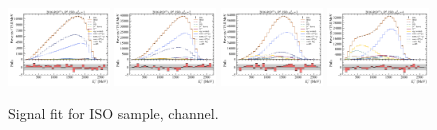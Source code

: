 \begin{figure}[!htb]
    \includegraphics[width=0.24\textwidth]{./figs-fit-fit-results/sig-fit/lines_q2_slices/fit_result-lines_q2_idx1-D0-iso-el.pdf}
    \includegraphics[width=0.24\textwidth]{./figs-fit-fit-results/sig-fit/lines_q2_slices/fit_result-lines_q2_idx2-D0-iso-el.pdf}
    \includegraphics[width=0.24\textwidth]{./figs-fit-fit-results/sig-fit/lines_q2_slices/fit_result-lines_q2_idx3-D0-iso-el.pdf}
    \includegraphics[width=0.24\textwidth]{./figs-fit-fit-results/sig-fit/lines_q2_slices/fit_result-lines_q2_idx4-D0-iso-el.pdf}

    \caption{Signal fit for ISO sample, \Dz channel.}
    \label{fig:sig-d0}
\end{figure}

